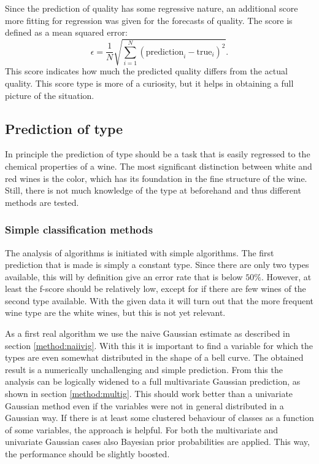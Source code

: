 \documentclass[twoside]{article}
\begin{document}
\begin{multicols}{2}
Since the prediction of quality has some regressive nature, an additional score more fitting for regression was given
for the forecasts of quality. The score is defined as a mean squared error:
\begin{equation}\label{distmetric}
 \epsilon = \frac{1}{N} \sqrt{ \sum_{i=1}^N ( \text{prediction}_i - \text{true}_i )^2 }.
\end{equation}
This score indicates how much the predicted quality differs from the actual quality. This score type is more of a curiosity,
but it helps in obtaining a full picture of the situation.

\subsection{Prediction of type}

In principle the prediction of type should be a task that is easily regressed to the chemical properties of a wine.
The most significant distinction between white and red wines is the color, which has its foundation in the fine structure of 
the wine. Still, there is not much knowledge of the type at beforehand and thus different methods are tested.

\subsubsection{Simple classification methods}

The analysis of algorithms is initiated with simple algorithms. The first prediction that is made is simply a constant
type. Since there are only two types available, this will by definition give an error rate that is below $50\%$. However,
at least the f-score should be relatively low, except for if there are few wines of the second type available. With the given
data it will turn out that the more frequent wine type are the white wines, but this is not yet relevant.

As a first real algorithm we use the naive Gaussian estimate as described in section \ref{method:naiivig}. With this it is
important to find a variable for which the types are even somewhat distributed in the shape of a bell curve. The obtained 
result is a numerically unchallenging and simple prediction. From this the analysis can be logically widened to a full
multivariate Gaussian prediction, as shown in section \ref{method:multig}. This should work better than a univariate
Gaussian method even if the variables were not in general distributed in a Gaussian way. If there is at least some
clustered behaviour of classes as a function of some variables, the approach is helpful. For both the multivariate
and univariate Gaussian cases also Bayesian prior probabilities are applied. This way, the performance should be 
slightly boosted.


\end{multicols}
\end{document}
